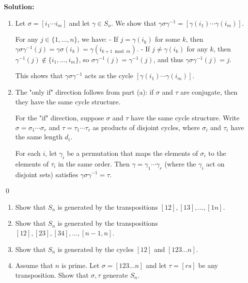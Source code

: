 \noindent\textbf{Solution:}
\begin{enumerate}[label=(\alph*)]
\item Let $\sigma = [i_1 \cdots i_m]$ and let $\gamma \in S_n$. We show that $\gamma\sigma\gamma^{-1} = [\gamma(i_1) \cdots \gamma(i_m)]$.

For any $j \in \{1, \ldots, n\}$, we have:
- If $j = \gamma(i_k)$ for some $k$, then $\gamma\sigma\gamma^{-1}(j) = \gamma\sigma(i_k) = \gamma(i_{k+1 \bmod m})$.
- If $j \neq \gamma(i_k)$ for any $k$, then $\gamma^{-1}(j) \notin \{i_1, \ldots, i_m\}$, so $\sigma\gamma^{-1}(j) = \gamma^{-1}(j)$, and thus $\gamma\sigma\gamma^{-1}(j) = j$.

This shows that $\gamma\sigma\gamma^{-1}$ acts as the cycle $[\gamma(i_1) \cdots \gamma(i_m)]$.

\item The "only if" direction follows from part (a): if $\sigma$ and $\tau$ are conjugate, then they have the same cycle structure.

For the "if" direction, suppose $\sigma$ and $\tau$ have the same cycle structure. Write $\sigma = \sigma_1 \cdots \sigma_r$ and $\tau = \tau_1 \cdots \tau_r$ as products of disjoint cycles, where $\sigma_i$ and $\tau_i$ have the same length $d_i$.

For each $i$, let $\gamma_i$ be a permutation that maps the elements of $\sigma_i$ to the elements of $\tau_i$ in the same order. Then $\gamma = \gamma_1 \cdots \gamma_r$ (where the $\gamma_i$ act on disjoint sets) satisfies $\gamma\sigma\gamma^{-1} = \tau$.
\end{enumerate}


\qed
\begin{problembox}
\begin{enumerate}[label=(\alph*)]
\item Show that $S_n$ is generated by the transpositions $[12], [13], \ldots, [1n]$.
\item Show that $S_n$ is generated by the transpositions $[12], [23], [34], \ldots, [n - 1, n]$.
\item Show that $S_n$ is generated by the cycles $[12]$ and $[123 \ldots n]$.
\item Assume that $n$ is prime. Let $\sigma = [123 \ldots n]$ and let $\tau = [rs]$ be any transposition. Show that $\sigma, \tau$ generate $S_n$.
\end{enumerate}
\end{problembox}

